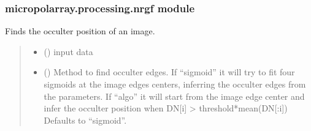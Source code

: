 \documentclass[letterpaper,10pt,english]{sphinxmanual}
\begin{document}
\subsubsection{micropolarray.processing.nrgf module}
\label{\detokenize{micropolarray.processing:module-micropolarray.processing.nrgf}}\label{\detokenize{micropolarray.processing:micropolarray-processing-nrgf-module}}

\begin{fulllineitems}
\label{\detokenize{micropolarray.processing:micropolarray.processing.nrgf.find_occulter_position}}
\pysigstartsignatures
{}
\pysigstopsignatures
\sphinxAtStartPar
Finds the occulter position of an image.
\begin{quote}\begin{description}
\begin{itemize}
\item {} 
\sphinxAtStartPar
{} () \textendash{} input data

\item {} 
\sphinxAtStartPar
{} (\sphinxstyleliteralemphasis{\sphinxupquote{, }}) \textendash{} Method to find occulter edges. If “sigmoid” it will try to fit four sigmoids at the image edges centers, inferring the occulter edges from the parameters. If “algo” it will start from the image edge center and infer the occulter position when DN{[}i{]} \textgreater{} threshold*mean(DN{[}:i{]}) Defaults to “sigmoid”.


\end{itemize}
\end{description}
\end{quote}
\end{fulllineitems}
\end{document}
